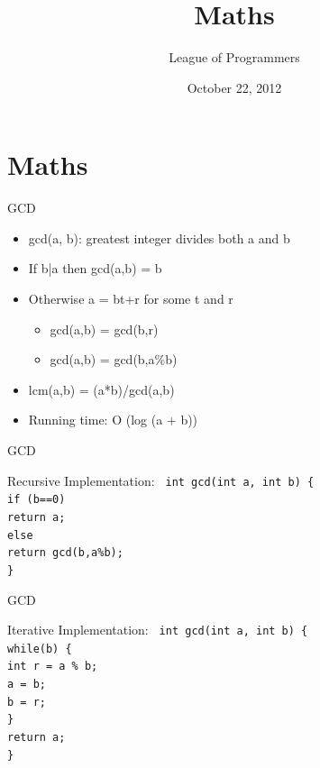 \documentclass{beamer}
\title{Maths
}
\author{League of Programmers}
\institute{ACA, IIT Kanpur}
\date{October 22, 2012}
\begin{document}
\begin{frame}
  \titlepage
\end{frame}

\section{Maths}

\begin{frame}[<+->]{GCD}
\begin{itemize}
  \item gcd(a, b): greatest integer divides both a and b
  \item If b|a then gcd(a,b) = b
  \item Otherwise a = bt+r for some t and r\\
  \begin{itemize}
    \item gcd(a,b) = gcd(b,r)
    \item gcd(a,b) = gcd(b,a\%b)
  \end{itemize}
  \item lcm(a,b) = (a*b)/gcd(a,b)
  \item Running time: O (log (a + b))
\end{itemize}
\end{frame}

\begin{frame}{GCD}
  \begin{block}{Recursive Implementation:}
  \tt{
    int gcd(int a, int b) \{\\
      \hspace{2mm} if (b==0)\\
	\hspace{5mm} return a;\\
      \hspace{2mm} else\\
	\hspace{5mm} return gcd(b,a\%b);\\
     \}
    }
  \end{block}
\end{frame}

\begin{frame}{GCD}
  \begin{block}{Iterative Implementation:}
  \tt{
    int gcd(int a, int b) \{\\
      \hspace{2mm} while(b) \{\\
	\hspace{5mm} int r = a \% b;\\
	\hspace{5mm} a = b;\\
	\hspace{5mm} b = r;\\
      \hspace{2mm} \}\\
      \hspace{2mm} return a;\\
     \}
    }
  \end{block}
\end{frame}
\end{document}

